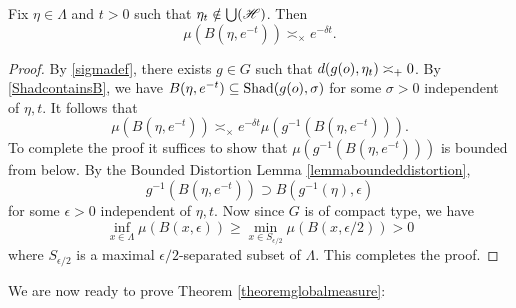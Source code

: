 \begin{lemma}
\label{lemmaCCBglobalmeasure}
Fix $\eta\in\Lambda$ and $t > 0$ such that $\eta_t\notin\bigcup(\mathscr H)$. Then
\[
\mu(B(\eta,e^{-t})) \asymp_\times e^{-\delta t}.
\]
\end{lemma}
\begin{proof}
By \eqref{sigmadef}, there exists $g\in G$ such that $d(g(o),\eta_t) \asymp_+ 0$. By \eqref{ShadcontainsB}, we have $B(\eta,e^{-t}) \subseteq \operatorname{Shad}(g(o),\sigma)$ for some $\sigma > 0$ independent of $\eta,t$. It follows that
\[
\mu(B(\eta,e^{-t})) \asymp_\times e^{-\delta t} \mu(g^{-1}(B(\eta,e^{-t}))).
\]
To complete the proof it suffices to show that $\mu(g^{-1}(B(\eta,e^{-t})))$ is bounded from below. By the Bounded Distortion Lemma \ref{lemmaboundeddistortion},
\[
g^{-1}(B(\eta,e^{-t})) \supset B(g^{-1}(\eta),\epsilon)
\]
for some $\epsilon > 0$ independent of $\eta,t$. Now since $G$ is of compact type, we have
\[
\inf_{x\in\Lambda} \mu(B(x,\epsilon)) \geq \min_{x\in S_{\epsilon/2}} \mu(B(x,\epsilon/2)) > 0
\]
where $S_{\epsilon/2}$ is a maximal $\epsilon/2$-separated subset of $\Lambda$. This completes the proof.
\end{proof}

We are now ready to prove Theorem \ref{theoremglobalmeasure}:

